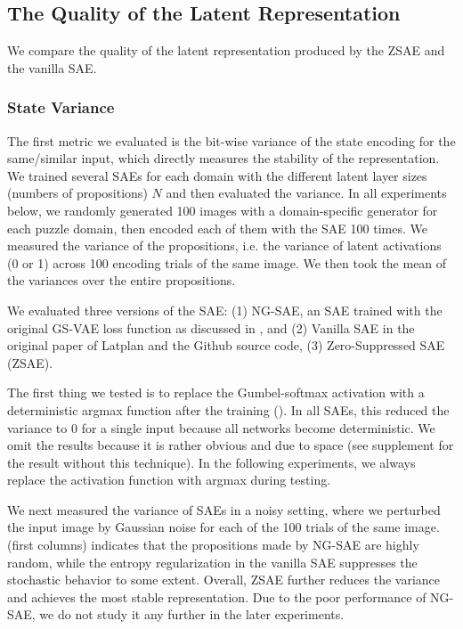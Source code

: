 \subsection{The Quality of the Latent Representation}

We compare the quality of the latent representation
produced by the ZSAE and the vanilla SAE.

\subsubsection{State Variance}

The first metric we evaluated is the bit-wise variance of the state encoding for the same/similar input,
which directly measures the stability of the representation.
We trained several SAEs for each domain with the different latent layer sizes (numbers of propositions) $N$
and then evaluated the variance.
In all experiments below,
we randomly generated 100 images with a domain-specific generator for each puzzle domain,
then encoded each of them with the SAE 100 times.
We measured the variance of the propositions, i.e. the variance of latent activations (0 or 1)
across 100 encoding trials of the same image.
We then took the mean of the variances over the entire propositions.

We evaluated three versions of the SAE:
(1) NG-SAE, an SAE trained with the original GS-VAE loss function as discussed in , and
(2) Vanilla SAE in the original paper of Latplan \cite{Asai2018} and the Github source code,
(3) Zero-Suppressed SAE (ZSAE).

The first thing we tested is to replace the Gumbel-softmax activation with a deterministic argmax function
after the training ().
In all SAEs, this reduced the variance to 0 for a single input because all networks become deterministic.
We omit the results because it is rather obvious and due to space
(see supplement  for the result without this technique).
In the following experiments, we always replace the activation function with argmax during testing.

We next measured the variance of SAEs in a noisy setting, where
we perturbed the input image by Gaussian noise for each of the 100 trials of the same image.
 (first columns) indicates that
the propositions made by NG-SAE are highly random,
while the entropy regularization in the vanilla SAE suppresses the stochastic behavior to some extent.
Overall, ZSAE further reduces the variance and achieves the most stable representation.
% 
Due to the poor performance of NG-SAE, we do not study it any further in the later experiments.

